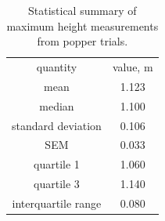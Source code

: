 \begin{table}
  \caption{Statistical summary of maximum height measurements from popper trials.}
  \label{tab:stats}
  \begin{center}
    \begin{ruledtabular}
      \begin{tabular}{cc}
        quantity & value, \unit{\meter} \\
        \colrule
        mean & \num{1.123} \\
        median & \num{1.100} \\
        standard deviation & \num{0.106} \\
        SEM & \num{0.033} \\
        quartile 1 & \num{1.060} \\
        quartile 3 & \num{1.140} \\
        interquartile range & \num{0.080} \\
      \end{tabular}
    \end{ruledtabular}
  \end{center}
\end{table}